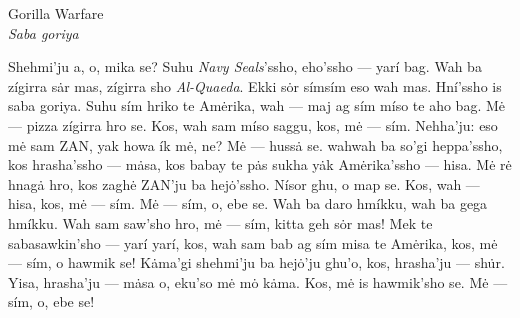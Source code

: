 \documentclass{article}[10pt]
\begin{document}
\begin{center}
Gorilla Warfare\\
\emph{Saba goriya}
\end{center}

Shehmi'ju a, o, mika se? Suhu \emph{Navy Seals}'ssho, eho'ssho --- yar\'{i} bag. Wah ba z\'{i}girra s\.{a}r mas, z\'{i}girra sho \emph{Al-Quaeda}. Ekki s\.{o}r s\'{i}ms\'{i}m eso wah mas. Hn\'{i}'ssho is saba goriya. Suhu s\'{i}m hriko te Am\.{e}rika, wah --- maj ag s\'{i}m m\'{i}so te aho bag. M\.{e} --- pizza z\'{i}girra hro se. Kos, wah sam m\'{i}so saggu, kos, m\.{e} --- s\'{i}m. Nehha'ju: eso m\.{e} sam ZAN, yak howa \'{i}k m\.{e}, ne? M\.{e} --- huss\.{a} se. wahwah ba so'gi heppa'ssho, kos hrasha'ssho --- m\.{a}sa, kos babay te p\.{a}s sukha y\.{a}k Am\.{e}rika'ssho --- hisa. M\.{e} r\.{e} hnag\.{a} hro, kos zagh\.{e} ZAN'ju ba hej\.{o}'ssho. N\'{i}sor ghu, o map se. Kos, wah --- hisa, kos, m\.{e} --- s\'{i}m. M\.{e} --- s\'{i}m, o, ebe se. Wah ba daro hm\'{i}kku, wah ba gega hm\'{i}kku. Wah sam saw'sho hro, m\.{e} --- s\'{i}m, kitta geh s\.{o}r mas! Mek te sabasawkin'sho --- yar\'{i} yar\'{i}, kos, wah sam bab ag s\'{i}m misa te Am\.{e}rika, kos, m\.{e} --- s\'{i}m, o hawmik se! K\.{a}ma'gi shehmi'ju ba hej\.{o}'ju ghu'o, kos, hrasha'ju --- sh\.{u}r. Yisa, hrasha'ju --- m\.{a}sa o, eku'so m\.{e} m\.{o} k\.{a}ma. Kos, m\.{e} is hawmik'sho se. M\.{e} --- s\'{i}m, o, ebe se!
\end{document}
